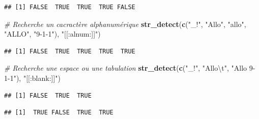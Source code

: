 \documentclass[
  11pt,
]{book}
\newenvironment{Shaded}{\begin{snugshade}}{\end{snugshade}}
\newcommand{\CharTok}[1]{\textcolor[rgb]{0.31,0.60,0.02}{#1}}
\newcommand{\CommentTok}[1]{\textcolor[rgb]{0.56,0.35,0.01}{\textit{#1}}}
\newcommand{\KeywordTok}[1]{\textcolor[rgb]{0.13,0.29,0.53}{\textbf{#1}}}
\newcommand{\NormalTok}[1]{#1}
\newcommand{\StringTok}[1]{\textcolor[rgb]{0.31,0.60,0.02}{#1}}
\numberwithin{equation}{section}
\numberwithin{countremarque}{section}
\begin{document}
\begin{lstlisting}
## [1] FALSE  TRUE  TRUE  TRUE FALSE
\end{lstlisting}

\begin{Shaded}
\begin{Highlighting}[]
\CommentTok{\# Recherche un cacractère alphanumérique}
\KeywordTok{str\_detect}\NormalTok{(}\KeywordTok{c}\NormalTok{(}\StringTok{"\_!"}\NormalTok{, }\StringTok{"Allo"}\NormalTok{, }\StringTok{"allo"}\NormalTok{, }\StringTok{"ALLO"}\NormalTok{, }\StringTok{"9{-}1{-}1"}\NormalTok{), }\StringTok{"[[:alnum:]]"}\NormalTok{)}
\end{Highlighting}
\end{Shaded}

\begin{lstlisting}
## [1] FALSE  TRUE  TRUE  TRUE  TRUE
\end{lstlisting}

\begin{Shaded}
\begin{Highlighting}[]
\CommentTok{\# Recherche une espace ou une tabulation}
\KeywordTok{str\_detect}\NormalTok{(}\KeywordTok{c}\NormalTok{(}\StringTok{"\_!"}\NormalTok{, }\StringTok{"Allo}\CharTok{\textbackslash{}t}\StringTok{"}\NormalTok{, }\StringTok{"Allo 9{-}1{-}1"}\NormalTok{), }\StringTok{"[[:blank:]]"}\NormalTok{)}
\end{Highlighting}
\end{Shaded}

\begin{lstlisting}
## [1] FALSE  TRUE  TRUE
\end{lstlisting}

\begin{Shaded}
\end{Shaded}

\begin{lstlisting}
## [1]  TRUE FALSE  TRUE  TRUE
\end{lstlisting}
\end{document}
